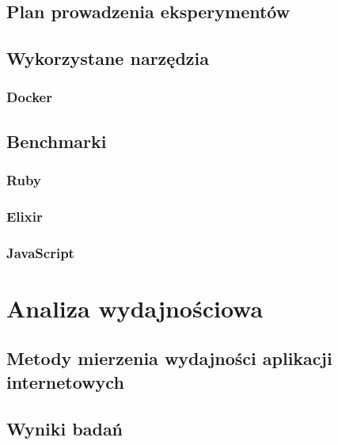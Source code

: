 \documentclass[mgr,oneside]{mgr}
\begin{document}
\section{Plan prowadzenia eksperymentów}

\section{Wykorzystane narzędzia}
\subsection{Docker}
\section{Benchmarki}
\subsection{Ruby}
\subsection{Elixir}
\subsection{JavaScript}

\chapter{Analiza wydajnościowa}
\label{cha:analiza_wydajnosciowa}
\section{Metody mierzenia wydajności aplikacji internetowych}
\section{Wyniki badań}
\end{document}
